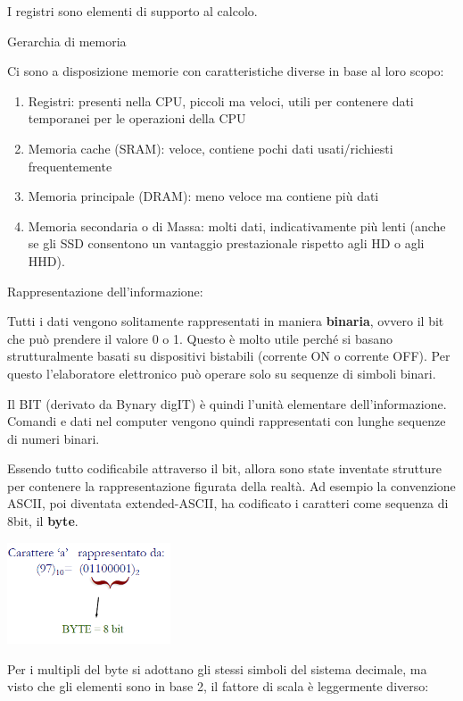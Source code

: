 \documentclass[
  paper=a4,
  oneside  ,captions=tableheading
]{scrbook}
\providecommand{\tightlist}{%
  \setlength{\itemsep}{0pt}\setlength{\parskip}{0pt}}
\begin{document}
I registri sono elementi di supporto al calcolo.

Gerarchia di memoria

Ci sono a disposizione memorie con caratteristiche diverse in base al
loro scopo:

\begin{enumerate}
\def\labelenumi{\arabic{enumi}.}
\tightlist
\item
  Registri: presenti nella CPU, piccoli ma veloci, utili per contenere
  dati temporanei per le operazioni della CPU
\item
  Memoria cache (SRAM): veloce, contiene pochi dati usati/richiesti
  frequentemente
\item
  Memoria principale (DRAM): meno veloce ma contiene più dati
\item
  Memoria secondaria o di Massa: molti dati, indicativamente più lenti
  (anche se gli SSD consentono un vantaggio prestazionale rispetto agli
  HD o agli HHD).
\end{enumerate}

Rappresentazione dell'informazione:

Tutti i dati vengono solitamente rappresentati in maniera
\textbf{binaria}, ovvero il bit che può prendere il valore 0 o 1. Questo
è molto utile perché si basano strutturalmente basati su dispositivi
bistabili (corrente ON o corrente OFF). Per questo l'elaboratore
elettronico può operare solo su sequenze di simboli binari.

Il BIT (derivato da Bynary digIT) è quindi l'unità elementare
dell'informazione. Comandi e dati nel computer vengono quindi
rappresentati con lunghe sequenze di numeri binari.

Essendo tutto codificabile attraverso il bit, allora sono state
inventate strutture per contenere la rappresentazione figurata della
realtà. Ad esempio la convenzione ASCII, poi diventata extended-ASCII,
ha codificato i caratteri come sequenza di 8bit, il \textbf{byte}.

\includegraphics[height=3cm]{./image/image-20201111184647324.png}

Per i multipli del byte si adottano gli stessi simboli del sistema
decimale, ma visto che gli elementi sono in base 2, il fattore di scala
è leggermente diverso:
\end{document}
